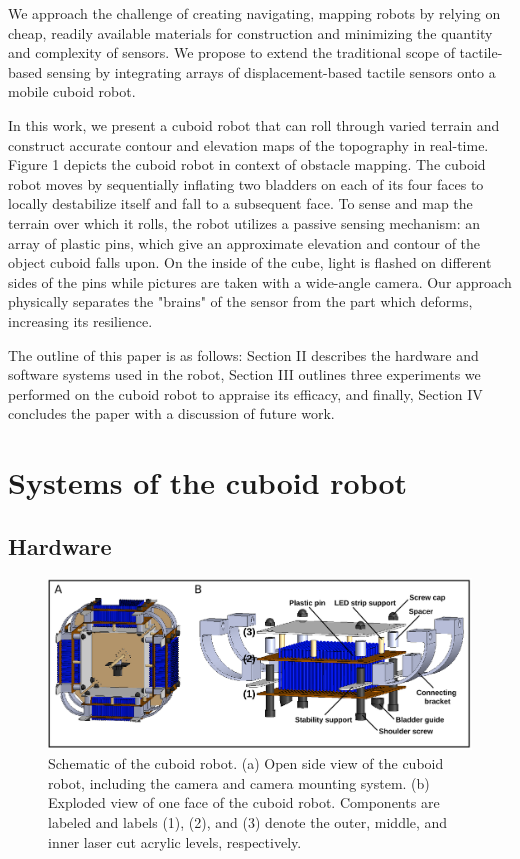 \documentclass[letterpaper, 12 pt, conference]{ieeeconf}  %
\begin{document}
We approach the challenge of creating navigating, mapping robots by relying on cheap, readily available materials for construction and minimizing the quantity and complexity of sensors. We propose to extend the traditional scope of tactile-based sensing by integrating arrays of displacement-based tactile sensors onto a mobile cuboid robot. 

In this work, we present a cuboid robot that can roll through varied terrain and construct accurate contour and elevation maps of the topography in real-time. Figure 1 depicts the cuboid robot in context of obstacle mapping. The cuboid robot moves by sequentially inflating two bladders on each of its four faces to locally destabilize itself and fall to a subsequent face. To sense and map the terrain over which it rolls, the robot utilizes a passive sensing mechanism: an array of plastic pins, which give an approximate elevation and contour of the object cuboid falls upon. On the inside of the cube, light is flashed on different sides of the pins while pictures are taken with a wide-angle camera. Our approach physically separates the "brains" of the sensor from the part which deforms, increasing its resilience. 

The outline of this paper is as follows: Section II describes the hardware and software systems used in the robot, Section III outlines three experiments we performed on the cuboid robot to appraise its efficacy, and finally, Section IV concludes the paper with a  discussion of future work. 

\section{Systems of the cuboid robot}

\subsection{Hardware}

 \begin{figure}
 \centering
 \includegraphics[width = 16cm]{Figures/explode.png}
 \caption{Schematic of the cuboid robot. (a) Open side view of the cuboid robot, including the camera and camera mounting system. (b) Exploded view of one face of the cuboid robot. Components are labeled and labels (1), (2), and (3) denote the outer, middle, and inner laser cut acrylic levels, respectively.}
 \label{fig:face} 
 \end{figure}
\end{document}

